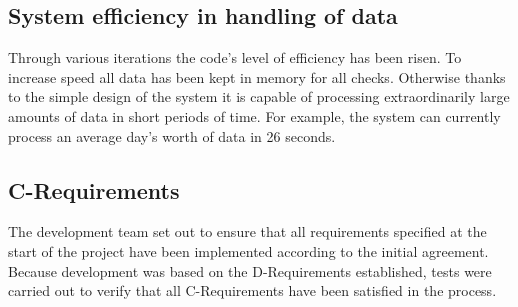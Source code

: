 \documentclass[12pt]{article}
\begin{document}
\subsection{System efficiency in handling of data}
Through various iterations the code's level of efficiency has been risen. To increase speed all data has been kept in memory for all checks.
Otherwise thanks to the simple design of the system it is capable of processing extraordinarily large amounts of data in short periods of time.
For example, the system can currently process an average day's worth of data in 26 seconds.
\subsection{C-Requirements}
The development team set out to ensure that all requirements specified at the start of the project have been implemented according to the initial agreement.
Because development was based on the D-Requirements established, tests were carried out to verify that all C-Requirements have been satisfied in the process.
\end{document}
